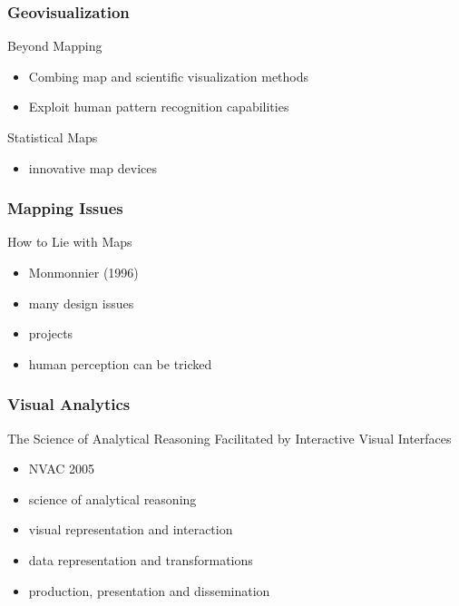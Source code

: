 \documentclass[nototal]{beamer}
\begin{document}
\begin{frame}
	\frametitle{Geovisualization}
 
\begin{block}{Beyond Mapping}
 \begin{itemize}
 \item  Combing map and scientific visualization methods
 \item  Exploit human pattern recognition capabilities
 \end{itemize}
 \end{block} 
\begin{block}{Statistical Maps}
 \begin{itemize}
 \item  innovative map devices
 \end{itemize}
 \end{block} \end{frame} 

\begin{frame}
	\frametitle{Mapping Issues}
 
\begin{block}{How to Lie with Maps}
 \begin{itemize}
 \item  Monmonnier (1996)
 \item  many design issues
 \item  projects
 \item  human perception can be tricked
 \end{itemize}
 \end{block} \end{frame} 

\begin{frame}
	\frametitle{Visual Analytics}
 
\begin{block}{The Science of Analytical Reasoning Facilitated by Interactive Visual Interfaces}
 \begin{itemize}
 \item  NVAC 2005
 \item  science of analytical reasoning
 \item  visual representation and interaction
 \item  data representation and transformations
 \item  production, presentation and dissemination
 \end{itemize}
 \end{block} \end{frame} 
\end{document}
